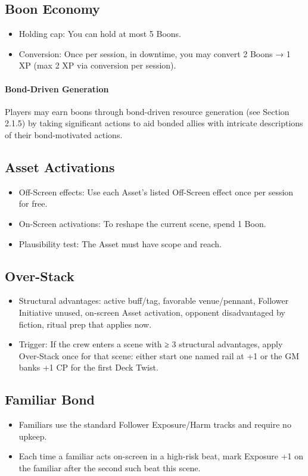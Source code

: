 \documentclass[11pt]{article}
\begin{document}
\subsection{Boon Economy}
\begin{itemize}
    \item Holding cap: You can hold at most 5 Boons.
    \item Conversion: Once per session, in downtime, you may convert 2 Boons → 1 XP (max 2 XP via conversion per session).
\end{itemize}

\paragraph{Bond-Driven Generation}
Players may earn boons through bond-driven resource generation (see Section 2.1.5) by taking significant actions to aid bonded allies with intricate descriptions of their bond-motivated actions.

\subsection{Asset Activations}
\begin{itemize}
    \item Off-Screen effects: Use each Asset's listed Off-Screen effect once per session for free.
    \item On-Screen activations: To reshape the current scene, spend 1 Boon.
    \item Plausibility test: The Asset must have scope and reach.
\end{itemize}

\subsection{Over-Stack}
\begin{itemize}
    \item Structural advantages: active buff/tag, favorable venue/pennant, Follower Initiative unused, on-screen Asset activation, opponent disadvantaged by fiction, ritual prep that applies now.
    \item Trigger: If the crew enters a scene with ≥ 3 structural advantages, apply Over-Stack once for that scene: either start one named rail at +1 or the GM banks +1 CP for the first Deck Twist.
\end{itemize}

\subsection{Familiar Bond}
\begin{itemize}
    \item Familiars use the standard Follower Exposure/Harm tracks and require no upkeep.
    \item Each time a familiar acts on-screen in a high-risk beat, mark Exposure +1 on the familiar after the second such beat this scene.
\end{itemize}
\end{document}
